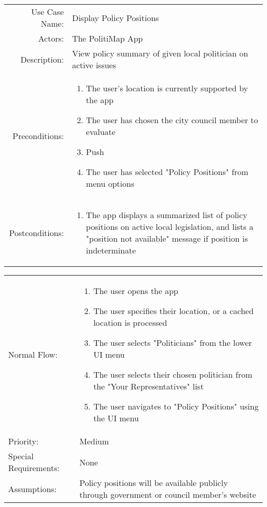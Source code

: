 \documentclass{beamer}
\begin{document}
\begin{frame}
\begin{tabu}{rX}
  Use Case Name: & Display Policy Positions\\
  Actors: & The PolitiMap App\\
  Description: & View policy summary of given local politician on active issues\\
  Preconditions: &
  \begin{enumerate}
  \item The user's location is currently supported by the app
  \item The user has chosen the city council member to evaluate
  \item Push
  \item The user has selected "Policy Positions" from menu options
  \end{enumerate} \\
  Postconditions: &
  \begin{enumerate}
  \item The app displays a summarized list of policy positions on active local legislation, and
  	lists a "position not available" message if position is indeterminate
  \end{enumerate} \\
\end{tabu}
\end{frame}
  \begin{frame}
    \begin{tabu}{lX}
  Normal Flow: &
  \begin{enumerate}
  \item The user opens the app
  \item The user specifies their location, or a cached location is processed
  \item The user selects "Politicians" from the lower UI menu
  \item The user selects their chosen politician from the "Your Representatives" list
  \item The user navigates to "Policy Positions" using the UI menu
  \end{enumerate} \\
  Priority: & Medium\\
  Special Requirements: & None\\
  Assumptions: & Policy positions will be available publicly through government or council member's website\\
\end{tabu}
\end{frame}
\end{document}
